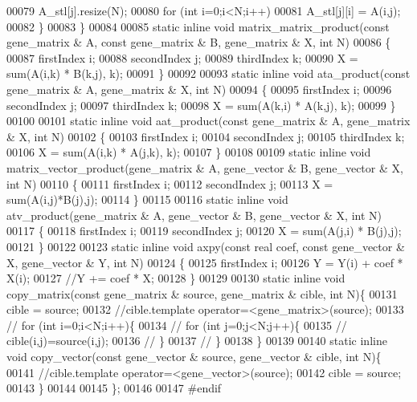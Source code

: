 \begin{DoxyCode}
00079       A\_stl[j].resize(N);
00080       \textcolor{keywordflow}{for} (\textcolor{keywordtype}{int} i=0;i<N;i++)
00081         A\_stl[j][i] = A(i,j);
00082     \}
00083   \}
00084 
00085   \textcolor{keyword}{static} \textcolor{keyword}{inline} \textcolor{keywordtype}{void} matrix\_matrix\_product(\textcolor{keyword}{const} gene\_matrix & A, \textcolor{keyword}{const} gene\_matrix & B, gene\_matrix & X, \textcolor{keywordtype}{
      int} N)
00086   \{
00087     firstIndex i;
00088     secondIndex j;
00089     thirdIndex k;
00090     X = sum(A(i,k) * B(k,j), k);
00091   \}
00092 
00093   \textcolor{keyword}{static} \textcolor{keyword}{inline} \textcolor{keywordtype}{void} ata\_product(\textcolor{keyword}{const} gene\_matrix & A, gene\_matrix & X, \textcolor{keywordtype}{int} N)
00094   \{
00095     firstIndex i;
00096     secondIndex j;
00097     thirdIndex k;
00098     X = sum(A(k,i) * A(k,j), k);
00099   \}
00100 
00101   \textcolor{keyword}{static} \textcolor{keyword}{inline} \textcolor{keywordtype}{void} aat\_product(\textcolor{keyword}{const} gene\_matrix & A, gene\_matrix & X, \textcolor{keywordtype}{int} N)
00102   \{
00103     firstIndex i;
00104     secondIndex j;
00105     thirdIndex k;
00106     X = sum(A(i,k) * A(j,k), k);
00107   \}
00108 
00109   \textcolor{keyword}{static} \textcolor{keyword}{inline} \textcolor{keywordtype}{void} matrix\_vector\_product(gene\_matrix & A, gene\_vector & B, gene\_vector & X, \textcolor{keywordtype}{int} N)
00110   \{
00111     firstIndex i;
00112     secondIndex j;
00113     X = sum(A(i,j)*B(j),j);
00114   \}
00115 
00116   \textcolor{keyword}{static} \textcolor{keyword}{inline} \textcolor{keywordtype}{void} atv\_product(gene\_matrix & A, gene\_vector & B, gene\_vector & X, \textcolor{keywordtype}{int} N)
00117   \{
00118     firstIndex i;
00119     secondIndex j;
00120     X = sum(A(j,i) * B(j),j);
00121   \}
00122 
00123   \textcolor{keyword}{static} \textcolor{keyword}{inline} \textcolor{keywordtype}{void} axpy(\textcolor{keyword}{const} real coef, \textcolor{keyword}{const} gene\_vector & X, gene\_vector & Y, \textcolor{keywordtype}{int} N)
00124   \{
00125     firstIndex i;
00126     Y = Y(i) + coef * X(i);
00127     \textcolor{comment}{//Y += coef * X;}
00128   \}
00129 
00130   \textcolor{keyword}{static} \textcolor{keyword}{inline} \textcolor{keywordtype}{void} copy\_matrix(\textcolor{keyword}{const} gene\_matrix & source, gene\_matrix & cible, \textcolor{keywordtype}{int} N)\{
00131     cible = source;
00132     \textcolor{comment}{//cible.template operator=<gene\_matrix>(source);}
00133 \textcolor{comment}{//     for (int i=0;i<N;i++)\{}
00134 \textcolor{comment}{//       for (int j=0;j<N;j++)\{}
00135 \textcolor{comment}{//         cible(i,j)=source(i,j);}
00136 \textcolor{comment}{//       \}}
00137 \textcolor{comment}{//     \}}
00138   \}
00139 
00140   \textcolor{keyword}{static} \textcolor{keyword}{inline} \textcolor{keywordtype}{void} copy\_vector(\textcolor{keyword}{const} gene\_vector & source, gene\_vector & cible, \textcolor{keywordtype}{int} N)\{
00141     \textcolor{comment}{//cible.template operator=<gene\_vector>(source);}
00142     cible = source;
00143   \}
00144 
00145 \};
00146 
00147 \textcolor{preprocessor}{#endif}
\end{DoxyCode}
